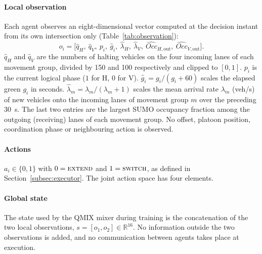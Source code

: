 \documentclass[review,12pt]{elsarticle}
\begin{document}
\paragraph{Local observation}
Each agent observes an eight-dimensional vector computed at the decision
instant from its own intersection only
(Table~\ref{tab:observation}):
\begin{equation}
o_i=\bigl[\hat q_H,\ \hat q_V,\ p_i,\ \hat g_i,\ \hat\lambda_H,\ \hat\lambda_V,\
\widehat{\mathit{Occ}}_{H,\mathrm{out}},\ \widehat{\mathit{Occ}}_{V,\mathrm{out}}\bigr].
\label{eq:observation}
\end{equation}
$\hat q_H$ and $\hat q_V$ are the numbers of halting vehicles on the
four incoming lanes of each movement group, divided by 150 and 100
respectively and clipped to $[0,1]$. $p_i$ is the current logical
phase ($1$ for H, $0$ for V). $\hat g_i=g_i/(g_i+60)$ scales the elapsed
green $g_i$ in seconds. $\hat\lambda_m=\lambda_m/(\lambda_m+1)$ scales
the mean arrival rate $\lambda_m$ (veh/s) of new vehicles onto the
incoming lanes of movement group $m$ over the preceding 30~s. The last
two entries are the largest SUMO occupancy fraction among the outgoing
(receiving) lanes of each movement group. No offset, platoon position,
coordination phase or neighbouring action is observed.

\paragraph{Actions}
$a_i\in\{0,1\}$ with $0=\textsc{extend}$ and $1=\textsc{switch}$, as
defined in Section~\ref{subsec:executor}. The joint action space has
four elements.

\paragraph{Global state}
The state used by the QMIX mixer during training is the concatenation
of the two local observations, $s=[o_1,o_2]\in\mathbb{R}^{16}$. No
information outside the two observations is added, and no
communication between agents takes place at execution.
\end{document}
